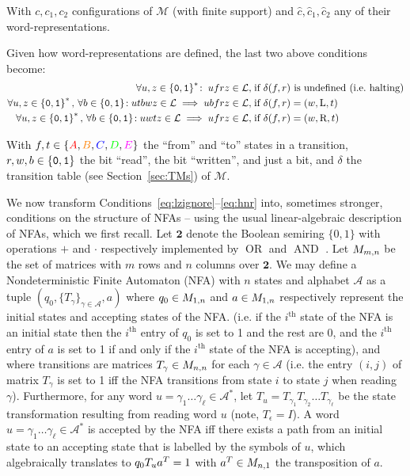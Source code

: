 With $c, c_1, c_2$ configurations of $\mathcal{M}$ (with finite support) and $\hat{c}, \hat{c}_1, \hat{c}_2$ any of their word-representations.


Given how word-representations are defined, the last two above conditions become:
\begin{align}
    \forall u,z\in\left\{\texttt{0},\texttt{1}\right\}^*\!: \; ufrz \in \mathcal{L},\;                                                             & \text{if $\delta(f,r)$ is undefined (i.e.~halting)} \label{eq:h0}
    \\
    \forall u,z\in\left\{\texttt{0},\texttt{1}\right\}^*,\,\forall b \in \left\{\texttt{0},\texttt{1}\right\}\!: utbwz \in \mathcal{L} \implies ubfrz \in \mathcal{L},\;     & \text{if $\delta(f,r) = (w,\text{L},t)$} \label{eq:hnl}
    \\
    \forall u,z\in\left\{\texttt{0},\texttt{1}\right\}^*,\,\forall b \in \left\{\texttt{0},\texttt{1}\right\}\!: u w t z \in \mathcal{L} \implies u f r z \in \mathcal{L},\; & \text{if $\delta(f,r) = (w,\text{R},t)$} \label{eq:hnr}
\end{align}

With $f,t \in \{\stateA,\stateB,\stateC,\stateD,\stateE\}$ the ``from'' and ``to'' states in a transition, $r,w,b \in \left\{\texttt{0},\texttt{1}\right\}$ the bit ``read'', the bit ``written'', and just a bit, and $\delta$ the transition table (see Section~\ref{sec:TMs}) of $\mathcal{M}$.


We now transform Conditions~\eqref{eq:lzignore}–\eqref{eq:hnr} into, sometimes stronger, conditions on the structure of NFAs -- using the usual linear-algebraic description of NFAs, which we first recall. Let $\mathbf{2}$ denote the Boolean semiring $\{0,1\}$ with operations $+$ and $\cdot$ respectively implemented by $\operatorname{OR}$ and $\operatorname{AND}$ \cite{CUNINGHAMEGREEN1991251}. Let $M_{m,n}$ be the set of matrices with $m$ rows and $n$ columns over $\mathbf{2}$. We may define a Nondeterministic Finite Automaton (NFA) with $n$ states and alphabet $\mathcal{A}$ as a tuple $(q_0, \{T_\gamma\}_{\gamma \in \mathcal{A}}, a)$ where $q_0 \in M_{1,n}$ and $a \in M_{1,n}$ respectively represent the initial states and accepting states of the NFA. (i.e. if the $i^\text{th}$ state of the NFA is an initial state then the $i^\text{th}$ entry of $q_0$ is set to 1 and the rest are 0, and the $i^\text{th}$ entry of $a$ is set to 1 if and only if the $i^\text{th}$ state of the NFA is accepting), and where transitions are matrices $T_\gamma\in M_{n,n}$ for each $\gamma\in\mathcal{A}$ (i.e. the entry $(i,j)$ of matrix $T_\gamma$ is set to 1 iff the NFA transitions from state $i$ to state $j$ when reading $\gamma$). Furthermore, for any word $u=\gamma_1\dots\gamma_\ell \in \mathcal{A}^*$, let $T_u = T_{\gamma_1} T_{\gamma_2} \dots T_{\gamma_\ell}$ be the state transformation resulting from reading word $u$ (note, $T_\epsilon = I$). A word $u=\gamma_1\dots\gamma_\ell \in \mathcal{A}^*$ is accepted by the NFA iff there exists a path from an initial state to an accepting state that is labelled by the symbols of $u$, which algebraically translates to $q_0 T_u a^{T} = 1$ with $a^{T} \in M_{n,1}$ the transposition of $a$.

